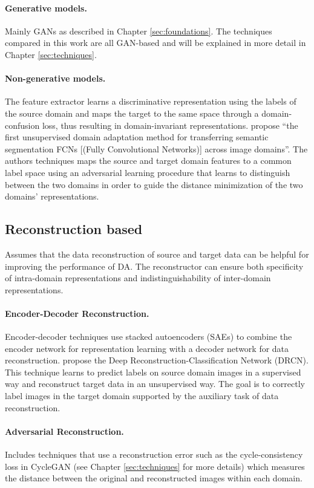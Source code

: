 \paragraph{Generative models.}
Mainly GANs as described in Chapter \ref{sec:foundations}. The techniques compared in this work are all GAN-based and will be explained in more detail in Chapter \ref{sec:techniques}.

\paragraph{Non-generative models.}
The feature extractor learns a discriminative representation using the labels of the source domain and maps the target to the same space through a domain-confusion loss, thus resulting in domain-invariant representations. \cite{DBLP:journals/corr/HoffmanWYD16} propose ``the first unsupervised domain adaptation method for transferring semantic segmentation FCNs [(Fully Convolutional Networks)] across image domains''. The authors techniques maps the source and target domain features to a common label space using an adversarial learning procedure that learns to distinguish between the two domains in order to guide the distance minimization of the two domains' representations. 

\subsection{Reconstruction based}
Assumes that the data reconstruction of source and target data can be helpful for improving the performance of DA. The reconstructor can ensure both specificity of intra-domain representations and indistinguishability of inter-domain representations.

\paragraph{Encoder-Decoder Reconstruction.}
Encoder-decoder techniques use stacked autoencoders (SAEs) to combine the encoder network for representation learning with a decoder network for data reconstruction. \cite{DBLP:journals/corr/GhifaryKZBL16} propose the Deep Reconstruction-Classification Network (DRCN). This technique learns to predict labels on source domain images in a supervised way and reconstruct target data in an unsupervised way. The goal is to correctly label images in the target domain supported by the auxiliary task of data reconstruction. 

\paragraph{Adversarial Reconstruction.}
Includes techniques that use a reconstruction error such as the cycle-consistency loss in CycleGAN (see Chapter \ref{sec:techniques} for more details) which measures the distance between the original and reconstructed images within each domain.